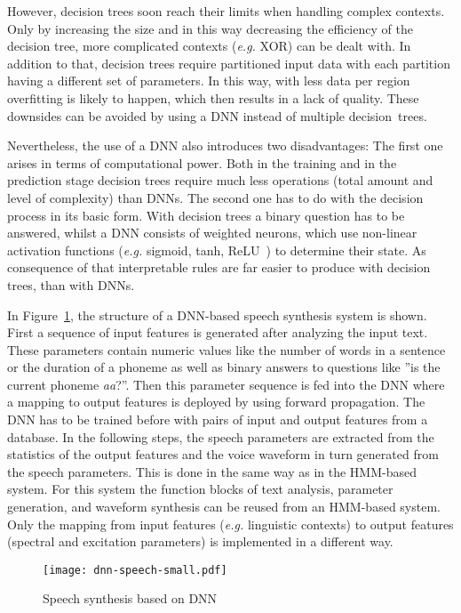 However, decision trees soon reach their limits when handling complex contexts. Only by increasing the size and in this way decreasing the efficiency of the decision tree, more complicated contexts (\textit{e.g.} XOR) can be dealt with. In addition to that, decision trees require partitioned input data with each partition having a different set of parameters. In this way, with less data per region overfitting
is likely to happen, which then results in a lack of quality. These downsides can be avoided by using a \ac{DNN} instead of multiple decision~trees.

Nevertheless, the use of a \ac{DNN} also introduces two disadvantages: The first one arises in terms of computational power. Both in the training and in the prediction stage decision trees require much less operations (total amount and level of complexity) than \acp{DNN}. The second one has to do with the decision process in its basic form. With decision trees a binary question has to be answered, whilst a \ac{DNN} consists of weighted neurons, which use non-linear activation functions (\textit{e.g.} sigmoid, tanh, ReLU~\cite{chung:activation}) to determine their state. As consequence of that interpretable rules are far easier to produce with decision trees, than with \acp{DNN}.

In Figure~\ref{fig:dnnspeech}, the structure of a \ac{DNN}-based speech synthesis system is shown. First a sequence of input features is generated after analyzing the input text. These parameters contain numeric values like the number of words in a sentence or the duration of a phoneme as well as binary answers to questions like ''is the current phoneme \textit{aa}?''. Then this parameter sequence is fed into the \ac{DNN} where a mapping to output features is deployed by using forward propagation. The \ac{DNN} has to be trained before with pairs of input and output features from a database. In the following steps, the speech parameters are extracted from the statistics of the output features and the voice waveform in turn generated from the speech parameters. This is done in the same way as in the \ac{HMM}-based system. For this system the function blocks of text analysis, parameter generation, and waveform synthesis can be reused from an \ac{HMM}-based system. Only the mapping from input features (\textit{e.g.} linguistic contexts) to output features (spectral and excitation parameters) is implemented in a different way.

\begin{figure}[h]
	\texttt{[image: dnn-speech-small.pdf]}
	\caption{Speech synthesis based on \ac{DNN}~\cite{zen:deepstatistical}}
	\label{fig:dnnspeech}
\end{figure}

